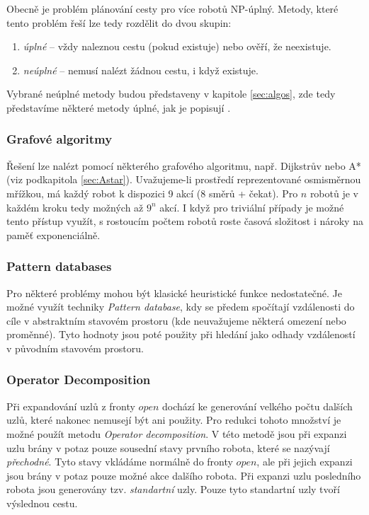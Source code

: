 Obecně je problém plánování cesty pro více robotů NP-úplný. Metody, které tento problém řeší lze tedy rozdělit do dvou skupin:
\begin{enumerate}
	\item \emph{úplné} -- vždy naleznou cestu (pokud existuje) nebo ověří, že neexistuje. %
	\item \emph{neúplné} -- nemusí nalézt žádnou cestu, i když existuje.
\end{enumerate}
Vybrané neúplné metody budou představeny v kapitole \ref{sec:algos}, zde tedy představíme některé metody úplné, jak je popisují \cite{Goldenberg2012,STANDLEY,Kraft2017}.

\subsubsection{Grafové algoritmy}
Řešení lze nalézt pomocí některého grafového algoritmu, např. Dijkstrův \cite{Dijkstra1959} nebo A* (viz podkapitola \ref{sec:Astar}). Uvažujeme-li prostředí reprezentované osmisměrnou mřížkou, má každý robot k dispozici 9 akcí (8 směrů + čekat). Pro $n$ robotů je v každém kroku tedy možných až $9^n$ akcí. I když pro triviální případy je možné tento přístup využít, s rostoucím počtem robotů roste časová složitost i nároky na paměť exponenciálně.

\subsubsection{Pattern databases}
Pro některé problémy mohou být klasické heuristické funkce nedostatečné. Je možné využít techniky \emph{Pattern database}, kdy se předem spočítají vzdálenosti do cíle v abstraktním stavovém prostoru (kde neuvažujeme některá omezení nebo proměnné). Tyto hodnoty jsou poté použity při hledání jako odhady vzdáleností v původním stavovém prostoru.

\subsubsection{Operator Decomposition}
Při expandování uzlů z fronty $open$ dochází ke generování velkého počtu dalších uzlů, které nakonec nemusejí být ani použity. Pro redukci tohoto množství je možné použít metodu \emph{Operator decomposition}. V této metodě jsou při expanzi uzlu brány v potaz pouze sousední stavy prvního robota, které se nazývají \emph{přechodné}. Tyto stavy vkládáme normálně do fronty $open$, ale při jejich expanzi jsou brány v potaz pouze možné akce dalšího robota. Při expanzi uzlu posledního robota jsou generovány tzv. \emph{standartní} uzly. Pouze tyto standartní uzly tvoří výslednou cestu. 

